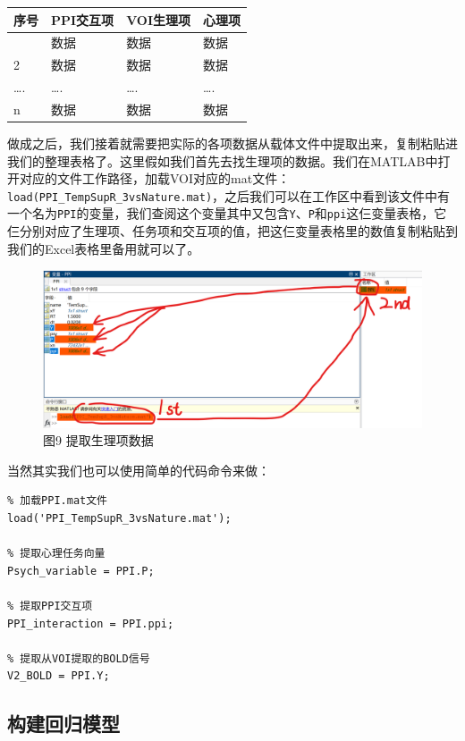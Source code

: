 \documentclass[
]{article}
\begin{document}
\begin{longtable}[]{@{}llll@{}}
\toprule\noalign{}
序号 & PPI交互项 & VOI生理项 & 心理项 \\
\midrule\noalign{}
\endhead
\bottomrule\noalign{}
\endlastfoot
1 & 数据 & 数据 & 数据 \\
2 & 数据 & 数据 & 数据 \\
\ldots. & \ldots. & \ldots. & \ldots. \\
n & 数据 & 数据 & 数据 \\
\end{longtable}

做成之后，我们接着就需要把实际的各项数据从载体文件中提取出来，复制粘贴进我们的整理表格了。这里假如我们首先去找生理项的数据。我们在MATLAB中打开对应的文件工作路径，加载VOI对应的mat文件：\texttt{load(\textquotesingle{}PPI\_TempSupR\_3vsNature.mat\textquotesingle{})}，之后我们可以在工作区中看到该文件中有一个名为\texttt{PPI}的变量，我们查阅这个变量其中又包含\texttt{Y}、\texttt{P}和\texttt{ppi}这仨变量表格，它仨分别对应了生理项、任务项和交互项的值，把这仨变量表格里的数值复制粘贴到我们的Excel表格里备用就可以了。

\begin{figure}
\centering
\includegraphics[width=5.72917in,height=\textheight]{extracting_terms.png}
\caption{图9 提取生理项数据}
\end{figure}

当然其实我们也可以使用简单的代码命令来做：

\begin{verbatim}
% 加载PPI.mat文件
load('PPI_TempSupR_3vsNature.mat');

% 提取心理任务向量
Psych_variable = PPI.P;

% 提取PPI交互项
PPI_interaction = PPI.ppi;

% 提取从VOI提取的BOLD信号
V2_BOLD = PPI.Y;
\end{verbatim}

\hypertarget{ux6784ux5efaux56deux5f52ux6a21ux578b}{%
\subsection{构建回归模型}\label{ux6784ux5efaux56deux5f52ux6a21ux578b}}
\end{document}
